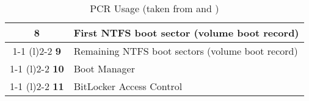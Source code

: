 \begin{table}[htb]
\begin{tabular}{cp{30em}}
        \multirow{2}{*}{\textbf{8}}                     & First \ac{NTFS} boot sector (volume boot record)                                                         \\
        \cmidrule[0.4pt](r){1-1}
        \cmidrule[0.4pt](l){2-2}
        \textbf{9}                                      & Remaining \ac{NTFS} boot sectors (volume boot record)                                                    \\
        \cmidrule[0.4pt](r){1-1}
        \cmidrule[0.4pt](l){2-2}
        \textbf{10}                                     & Boot Manager                                                                                             \\
        \cmidrule[0.4pt](r){1-1}
        \cmidrule[0.4pt](l){2-2}
        \textbf{11}                                     & BitLocker Access Control                                                                                 \\
        \bottomrule
    \end{tabular}%
    \caption{\ac{PCR} Usage (taken from \cite[Table 1]{tcg-pc-client-platform-firmware-profile-spec} and \cite[Table 9-2]{windows-internals-6-part2})}%
    \label{tab:pcr-usage}%
\end{table}
